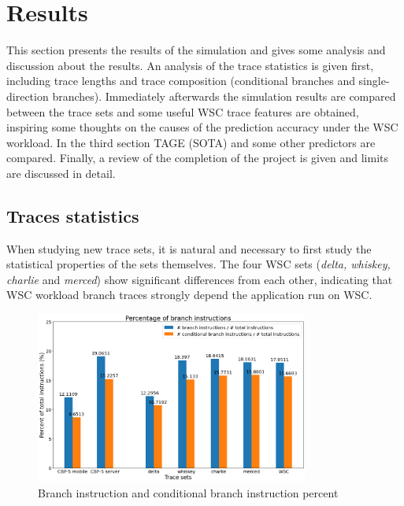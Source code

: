 \chapter{Results}

\ifpdf
    \graphicspath{{Chapter3/Figs/Raster/}{Chapter3/Figs/PDF/}{Chapter3/Figs/}}
\else
    \graphicspath{{Chapter3/Figs/Vector/}{Chapter3/Figs/}}
\fi

This section presents the results of the simulation and gives some analysis and discussion about the results. An analysis of the trace statistics is given first, including trace lengths and trace composition (conditional branches and single-direction branches). Immediately afterwards the simulation results are compared between the trace sets and some useful WSC trace features are obtained, inspiring some thoughts on the causes of the prediction accuracy under the WSC workload. In the third section TAGE\cite{seznec_tage-sc-l_2016, seznec_exploring_2016} (SOTA) and some other predictors \cite{pruett_dynamically_2016, jimenez_multiperspective_2016-1, jimenez_multiperspective_2016} are compared. Finally, a review of the completion of the project is given and limits are discussed in detail.

\section{Traces statistics}

When studying new trace sets, it is natural and necessary to first study the statistical properties of the sets themselves. The four WSC sets (\textit{delta, whiskey, charlie} and \textit{merced}) show significant differences from each other, indicating that WSC workload branch traces strongly depend the application run on WSC.


\begin{figure}[h!] 
\centering    
\includegraphics[width=0.8\textwidth]{Chapter3/Figs/br percent.png}
\caption{\centering Branch instruction and conditional branch instruction percent}
\label{fig:branchinstfrac}
\end{figure} %


